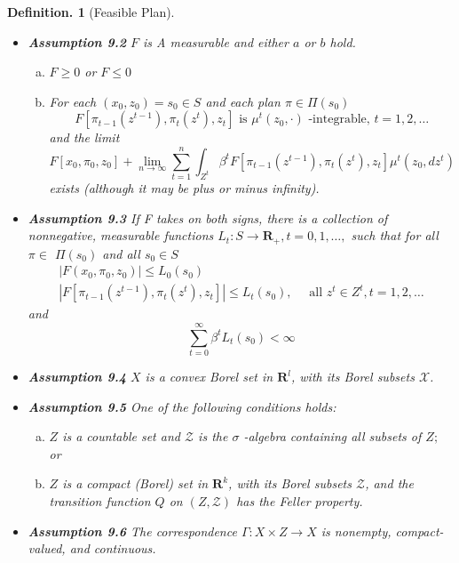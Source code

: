\documentclass{article}
\newtheorem{defin}{Definition.}
\theoremstyle{definition}
\begin{document}
\begin{defin}[Feasible Plan]
\begin{itemize}
is nonempty for all $s_{0} \in S .$ 
    \item \textbf{Assumption 9.2} $F$ is A measurable and either $a$ or $b$ hold.
\begin{enumerate}[a)]
    \item $F \geq 0$ or $F \leq 0$
    \item For each $\left(x_{0}, z_{0}\right)=s_{0} \in S$ and each plan $\pi \in \Pi\left(s_{0}\right)$
    $$
    F\left[\pi_{t-1}\left(z^{t-1}\right), \pi_{t}\left(z^{t}\right), z_{t}\right] \text { is } \mu^{t}\left(z_{0}, \cdot\right) \text { -integrable, } t=1,2, \ldots
    $$
    and the limit
    $$
    F\left[x_{0}, \pi_{0}, z_{0}\right]+\lim _{n \rightarrow \infty} \sum_{t=1}^{n} \int_{Z^{t}} \beta^{t} F\left[\pi_{t-1}\left(z^{t-1}\right), \pi_{t}\left(z^{t}\right), z_{t}\right] \mu^{t}\left(z_{0}, d z^{t}\right)
    $$
    exists (although it may be plus or minus infinity).
\end{enumerate}
    \item \textbf{Assumption 9.3} If F takes on both signs, there is a collection of nonnegative, measurable functions $L_{t}: S \rightarrow \mathbf{R}_{+}, t=0,1, \ldots,$ such that for all $\pi \in$ $\Pi\left(s_{0}\right)$ and all $s_{0} \in S$
$$
\begin{array}{l}
\left|F\left(x_{0}, \pi_{0}, z_{0}\right)\right| \leq L_{0}\left(s_{0}\right) \\
\left|F\left[\pi_{t-1}\left(z^{t-1}\right), \pi_{t}\left(z^{t}\right), z_{t}\right]\right| \leq L_{t}\left(s_{0}\right), \quad \text { all } z^{t} \in Z^{t}, t=1,2, \ldots
\end{array}
$$
and
$$
\sum_{t=0}^{\infty} \beta^{t} L_{t}\left(s_{0}\right)<\infty
$$
    \item \textbf{Assumption 9.4} $X$ is a convex Borel set in $\mathbf{R}^{l}$, with its Borel subsets $\mathscr{X}$.
    \item \textbf{Assumption 9.5} One of the following conditions holds:
    \begin{enumerate}[a)]
        \item $Z$ is a countable set and $\mathscr{Z}$ is the $\sigma$ -algebra containing all subsets of $Z ;$ or
        \item $Z$ is a compact (Borel) set in $\mathbf{R}^{k}$, with its Borel subsets $\mathscr{Z}$, and the transition function $Q$ on $(Z, \mathscr{Z})$ has the Feller property.
    \end{enumerate}
    
    \item \textbf{Assumption 9.6} The correspondence $\Gamma: X \times Z \rightarrow X$ is nonempty, compact-valued, and continuous.


\end{itemize}
\end{defin}
\end{document}
